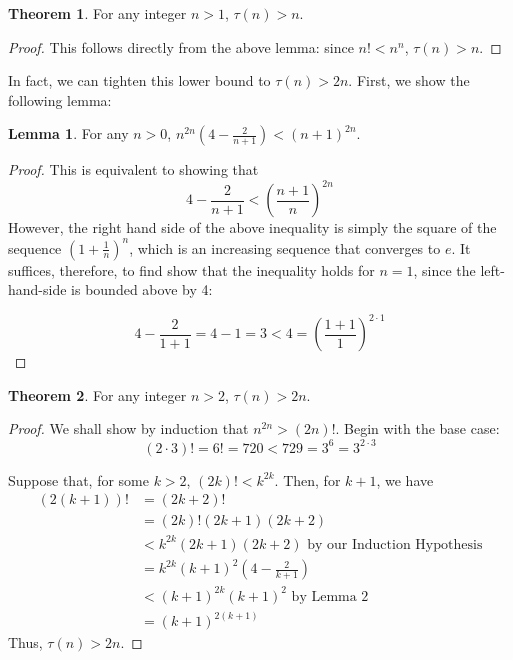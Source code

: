\documentclass[a4paper]{article}
\theoremstyle{definition}
\newtheorem{theorem}{Theorem}
\newtheorem{lemma}{Lemma}
\begin{document}
\begin{theorem}
For any integer $n > 1$, $\tau(n) > n$. 
\end{theorem}

\begin{proof}
This follows directly from the above lemma: since $n!<n^n$, $\tau(n)>n$.
\end{proof}

In fact, we can tighten this lower bound to $\tau(n)>2n$. First, we show the following lemma:

\begin{lemma}
For any $n>0$, $n^{2n}\left(4-\frac{2}{n+1}\right)<(n+1)^{2n}$.
\end{lemma}

\begin{proof}
This is equivalent to showing that \[4-\frac{2}{n+1}<\left(\frac{n+1}{n}\right)^{2n}\] However, the right hand side of the above inequality is simply the square of the sequence $\left(1+\frac{1}{n}\right)^n$, which is an increasing sequence that converges to $e$. It suffices, therefore, to find show that the inequality holds for $n=1$, since the left-hand-side is bounded above by 4:

\[4-\frac{2}{1+1}=4-1=3<4=\left(\frac{1+1}{1}\right)^{2\cdot1}\]
\end{proof}

\begin{theorem}
For any integer $n > 2$, $\tau(n)>2n$.
\end{theorem}

\begin{proof}
We shall show by induction that $n^{2n}>(2n)!$. Begin with the base case: \[(2\cdot3)!=6!=720<729=3^6=3^{2\cdot3}\]

Suppose that, for some $k>2$, $(2k)!<k^{2k}$. Then, for $k+1$, we have 
\begin{align*}
(2(k+1))!&=(2k+2)!\\
	 &=(2k)!(2k+1)(2k+2)\\
	 &<k^{2k}(2k+1)(2k+2)\text{ by our Induction Hypothesis}\\
	 &=k^{2k}(k+1)^2\left(4-\frac{2}{k+1}\right)\\
	 &<(k+1)^{2k}(k+1)^2\text{ by Lemma 2}\\
	 &=(k+1)^{2(k+1)}
\end{align*}
Thus, $\tau(n)>2n$. 
\end{proof}
\end{document}
